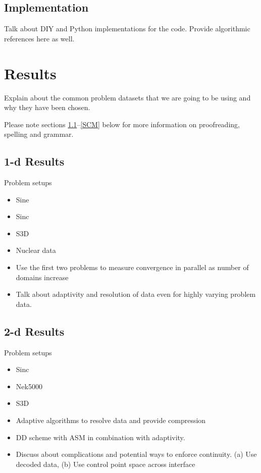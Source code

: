 \documentclass[conference]{IEEEtran}
\begin{document}
\subsection{Implementation}

Talk about DIY and Python implementations for the code. Provide algorithmic references here as well.

\section{Results}

Explain about the common problem datasets that we are going to be using and why they have been chosen.

Please note sections \ref{AA}--\ref{SCM} below for more information on 
proofreading, spelling and grammar.

\subsection{1-d Results}\label{AA}

Problem setups
\begin{itemize}
  \item Sine
  \item Sinc
  \item S3D
  \item Nuclear data
\end{itemize}

\begin{itemize}
	\item Use the first two problems to measure convergence in parallel as number of domains increase
	\item Talk about adaptivity and resolution of data even for highly varying problem data.
\end{itemize}

\subsection{2-d Results}

Problem setups
\begin{itemize}
	\item Sinc
	\item Nek5000
	\item S3D
\end{itemize}


\begin{itemize}
	\item Adaptive algorithms to resolve data and provide compression
	\item DD scheme with ASM in combination with adaptivity.
	\item Discuss about complications and potential ways to enforce continuity. (a) Use decoded data, (b) Use control point space across interface
\end{itemize}
\end{document}
